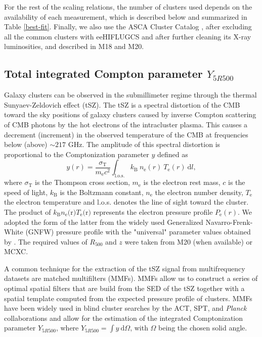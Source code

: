 \documentclass{aa}   %
\begin{document}
For the rest of the scaling relations, the number of clusters used depends on the availability of each measurement, which is described below and summarized in Table \ref{best-fit}. Finally, we also use the ASCA Cluster Catalog \citep[ACC,][]{horner}, after excluding all the common clusters with eeHIFLUGCS and after further cleaning its X-ray luminosities, and described in M18 and M20.

\subsection{Total integrated Compton parameter $Y_{5R500}$}\label{y500-extr}

Galaxy clusters can be observed in the submillimeter regime through the thermal Sunyaev-Zeldovich effect (tSZ). The tSZ is a spectral distortion of the CMB toward the sky positions of galaxy clusters caused by inverse Compton scattering of CMB photons by the hot electrons of the intracluster plasma. This causes a decrement (increment) in the observed temperature of the CMB at frequencies below (above) $\sim 217$ GHz. The amplitude of this spectral distortion is proportional to the Comptonization parameter $y$ defined as %
\begin{equation}
y(r)=\dfrac{\sigma _{\text{T}}}{m_{\text{e}} c^2}\int_{\text{l.o.s.}} k_{\text{B}}\ n_{\text{e}}(r)\ T_{\text{e}}(r)\ \mathrm{d} l,
\label{y-param}
\end{equation}
where $\sigma _{\text{T}}$ is the Thompson cross section, $m_{\text{e}}$ is the electron rest mass, $c$ is the speed of light, $k_{\text{B}}$ is the Boltzmann constant, $n_{\text{e}}$ the electron number density, $T_{\text{e}}$ the electron temperature and l.o.s. denotes the line of sight toward the cluster. The product of $k_{\text{B}}n_{\text{e}}\text{(r)}T_{\text{e}}\text{(r)}$ represents the electron pressure profile $P_{\text{e}}(r)$. We adopted the form of the latter from the widely used Generalized Navarro-Frenk-White (GNFW) pressure profile \citep{gnfw} with the "universal" parameter values obtained by \citet{arnaud2}. The required values of $R_{500}$ and $z$ were taken from M20 (when available) or MCXC.

A common technique for the extraction of the tSZ signal from multifrequency datasets are matched multifilters (MMFs). MMFs allow us to construct a series of optimal spatial filters that are build from the SED of the tSZ together with a spatial template computed from the expected pressure profile of clusters. MMFs have been widely used in blind cluster searches by the ACT, SPT, and \textit{Planck} collaborations \citep[][]{act,Hilton20,spt,Bleem20,Planck_PSZE,ade-c} and allow for the estimation of the integrated Comptonization parameter $Y_{5R500}$, where $Y_{5R500}=\int y\ \mathrm{d} \Omega$, with $\Omega$ being the chosen solid angle. 
\end{document}
